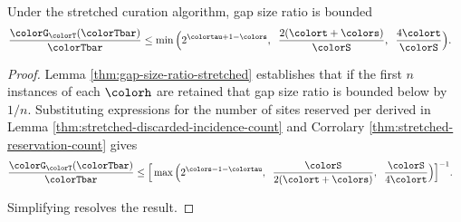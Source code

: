 \begin{theorem}
\label{thm:stretched-gap-size}
Under the stretched curation algorithm, gap size ratio is bounded
\begin{align*}
\frac{\colorG_{\colorT}(\colorTbar)}{\colorTbar}
&\leq
\min\Big(
  2^{\colortau+1-\colors},\;\;
  \frac{2(\colort + \colors)}{\colorS},\;\;
  \frac{4\colort}{\colorS}
\Big).
\end{align*}
\end{theorem}
\begin{proof}

Lemma \ref{thm:gap-size-ratio-stretched} establishes that if the first $n$ instances of each \hv{} $\colorh$ are retained that gap size ratio is bounded below by $1/n$.
Substituting expressions for the number of sites reserved per \hv{} derived in Lemma \ref{thm:stretched-discarded-incidence-count} and Corrolary \ref{thm:stretched-reservation-count} gives
\begin{align*}
  \frac{\colorG_{\colorT}(\colorTbar)}{\colorTbar}
  &\leq
  \Big[
    \max\Big(
      2^{\colors - 1 - \colortau},\;\;
      \frac{\colorS}{2(\colort + \colors)},\;\;
      \frac{\colorS}{4\colort}
    \Big)
  \Big]^{-1}.
\end{align*}

Simplifying resolves the result.

\end{proof}
